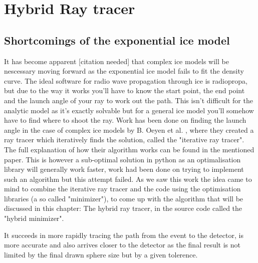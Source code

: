 \documentclass[11pt,a4paper,faculty=we,language=en,doctype=report]{cls/ugent-doc}
\begin{document}
\chapter{Hybrid Ray tracer}
\section{Shortcomings of the exponential ice model}
It has become apparent [citation needed] that complex ice models will be nescessary moving
forward as the exponential ice model fails to fit the density curve.  The ideal
software for radio wave propagation through ice is radiopropa\cite{Winchen_2019}, 
but due to the way it works you'll have to
know the start point, the end point and the launch angle of your ray to work
out the path. This isn't difficult for the analytic model as it's exactly solvable
but for a general ice model you'll somehow have to find where to shoot the ray.
Work has been done on finding the launch angle in the case of complex
ice models by B. Oeyen et al. \cite{2022icrc.confE1027O}, where they
created a ray tracer which iteratively finds the solution, called the
"iterative ray tracer".  The full explanation of how their algorithm works can
be found in the mentioned paper.  This is however a sub-optimal solution in
python as an optimalisation library will generally work faster, work had been
done on trying to implement such an algorithm but this attempt failed.  As we
saw this work the idea came to mind to combine the iterative ray tracer and the code
using the optimisation libraries (a so called "minimizer"), to come up with the
algorithm that will be discussed in this chapter: The hybrid ray tracer, in the
source code called the "hybrid minimizer".

It succeeds in more rapidly tracing the path from the event to the detector, is
more accurate and also arrives closer to the detector as the final result is
not limited by the final drawn sphere size but by a given tolerence.
\end{document}
